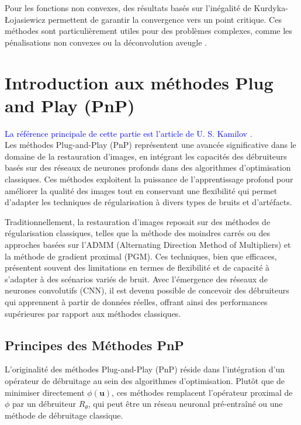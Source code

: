 \documentclass[a4paper, 12pt]{report} %
\newcommand{\modif}[1]{\textcolor{blue}{#1}}
\begin{document}
Pour les fonctions non convexes, des résultats basés sur l’inégalité de Kurdyka-Łojasiewicz permettent de garantir la convergence vers un point critique. Ces méthodes sont particulièrement utiles pour des problèmes complexes, comme les pénalisations non convexes ou la déconvolution aveugle \cite{chouzenoux2014variable}.
\section{Introduction aux méthodes Plug and Play (PnP)}

\modif{La référence principale de cette partie est l'article de U. S. Kamilov \cite{kamilov2023plug}.}\\

Les méthodes Plug-and-Play (PnP) représentent une avancée significative dans le domaine de la restauration d'images, en intégrant les capacités des débruiteurs basés sur des réseaux de neurones profonds dans des algorithmes d'optimisation classiques. Ces méthodes exploitent la puissance de l'apprentissage profond pour améliorer la qualité des images tout en conservant une flexibilité qui permet d'adapter les techniques de régularisation à divers types de bruits et d'artéfacts.


Traditionnellement, la restauration d'images reposait sur des méthodes de régularisation classiques, telles que la méthode des moindres carrés ou des approches basées sur l'ADMM (Alternating Direction Method of Multipliers) et la méthode de gradient proximal (PGM). Ces techniques, bien que efficaces, présentent souvent des limitations en termes de flexibilité et de capacité à s'adapter à des scénarios variés de bruit. Avec l'émergence des réseaux de neurones convolutifs (CNN), il est devenu possible de concevoir des débruiteurs qui apprennent à partir de données réelles, offrant ainsi des performances supérieures par rapport aux méthodes classiques.

\subsection{Principes des Méthodes PnP}

L’originalité des méthodes Plug-and-Play (PnP) réside dans l’intégration d’un opérateur de débruitage au sein des algorithmes d’optimisation. Plutôt que de minimiser directement \( \phi(\mathbf{u}) \), ces méthodes remplacent l’opérateur proximal de \( \phi \) par un débruiteur \( R_\theta \), qui peut être un réseau neuronal pré-entraîné ou une méthode de débruitage classique.
\end{document}
